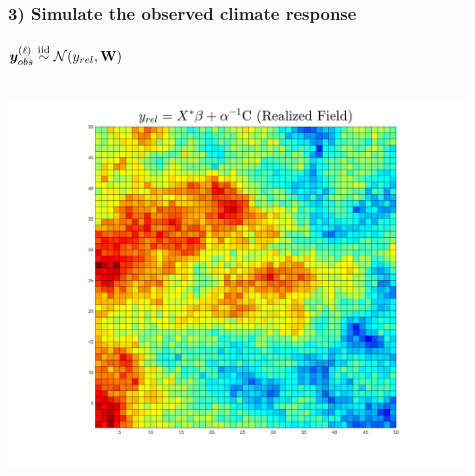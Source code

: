 \documentclass{beamer}
\newcommand{\iid}{\ensuremath{\stackrel{\text{iid}}{\sim}}}
\def\*#1{\bm{#1}}
\def\W{\textbf{\text{W}}}
\begin{document}

\begin{frame}
\frametitle{3) Simulate the observed climate response}
\framesubtitle{$\*y_{obs}^{(\ell)} \iid \mathcal N ( y_{rel}, \W)$}


\begin{columns}
\begin{column}{0.5\textwidth}
    \begin{center}
     \includegraphics[width=0.95\textwidth]{Images/yrealized.png} 
     \end{center}
\end{column}
\begin{column}{0.5\textwidth}
    \begin{center}

\end{center}
\end{column}
\end{columns}
\end{frame}
\end{document}
